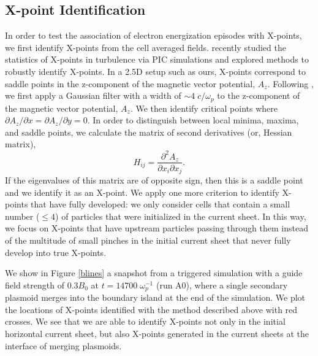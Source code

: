 \subsection{X-point Identification} \label{xpoint_id}
In order to test the association of electron energization episodes with X-points, we first identify X-points from the cell averaged fields.  \citet{haggerty2017} recently studied the statistics of X-points in turbulence via PIC simulations and explored methods to robustly identify X-points.  In a 2.5D setup such as ours, X-points correspond to saddle points in the z-component of the magnetic vector potential, $A_{z}$.  Following \citet{haggerty2017}, we first apply a Gaussian filter with a width of $\sim 4 \; c/\omega_{p}$ to the z-component of the magnetic vector potential, $A_{z}$.  We then identify critical points where $\partial A_{z}/\partial x=\partial A_{z}/\partial y=0$.  In order to distinguish between local minima, maxima, and saddle points, we calculate the matrix of second derivatives (or, Hessian matrix), 
$$H_{ij}=\frac{\partial^{2} A_{z}}{\partial x_{i} \partial x_{j}}.$$  If the eigenvalues of this matrix are of opposite sign, then this is a saddle point and we identify it as an X-point.  We apply one more criterion to identify X-points that have fully developed: we only consider cells that contain a small number ($\leq4$) of particles that were initialized in the current sheet.  In this way, we focus on X-points that have upstream particles passing through them instead of the multitude of small pinches in the initial current sheet that never fully develop into true X-points.  

We show in Figure \ref{blines} a snapshot from a triggered simulation with a guide field strength of $0.3 B_{0}$ at $t=14700 \; \omega_{p}^{-1}$ (run A0), where a single secondary plasmoid merges into the boundary island at the end of the simulation.  We plot the locations of X-points identified with the method described above with red crosses.  We see that we are able to identify X-points not only in the initial horizontal current sheet, but also X-points generated in the current sheets at the interface of merging plasmoids.

